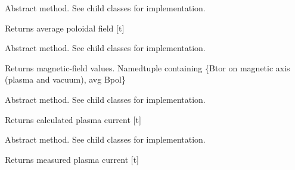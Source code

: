 \documentclass[letterpaper,10pt,english]{sphinxmanual}
\begin{document}
\begin{fulllineitems}
\begin{fulllineitems}
\end{fulllineitems}


\begin{fulllineitems}
\label{\detokenize{eqtools:eqtools.core.Equilibrium.getBpAvg}}
Abstract method.  See child classes for implementation.

Returns average poloidal field {[}t{]}

\end{fulllineitems}


\begin{fulllineitems}
\label{\detokenize{eqtools:eqtools.core.Equilibrium.getFields}}
Abstract method.  See child classes for implementation.

Returns magnetic-field values.
Namedtuple containing \{Btor on magnetic axis (plasma and vacuum), avg Bpol\}

\end{fulllineitems}


\begin{fulllineitems}
\label{\detokenize{eqtools:eqtools.core.Equilibrium.getIpCalc}}
Abstract method.  See child classes for implementation.

Returns calculated plasma current {[}t{]}

\end{fulllineitems}


\begin{fulllineitems}
\label{\detokenize{eqtools:eqtools.core.Equilibrium.getIpMeas}}
Abstract method.  See child classes for implementation.

Returns measured plasma current {[}t{]}


\end{fulllineitems}
\end{fulllineitems}
\end{document}

